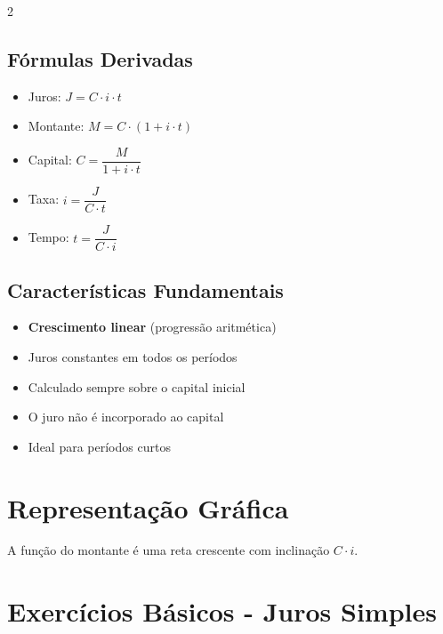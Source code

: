\documentclass[11pt]{article}
\begin{document}
\begin{multicols}{2}
\subsection*{Fórmulas Derivadas}
\begin{itemize}
\item Juros: $J = C \cdot i \cdot t$
\item Montante: $M = C \cdot (1 + i \cdot t)$
\item Capital: $C = \dfrac{M}{1 + i \cdot t}$
\item Taxa: $i = \dfrac{J}{C \cdot t}$
\item Tempo: $t = \dfrac{J}{C \cdot i}$
\end{itemize}

\subsection*{Características Fundamentais}
\begin{itemize}
\item \textbf{Crescimento linear} (progressão aritmética)
\item Juros constantes em todos os períodos
\item Calculado sempre sobre o capital inicial
\item O juro não é incorporado ao capital
\item Ideal para períodos curtos
\end{itemize}

\section*{Representação Gráfica}

\begin{center}
\end{center}

A função do montante é uma reta crescente com inclinação $C \cdot i$.

\section*{Exercícios Básicos - Juros Simples}


\end{multicols}
\end{document}
